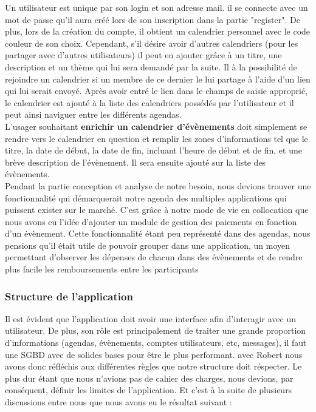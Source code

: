 Un utilisateur est unique par son login et son adresse mail. il se connecte avec un mot de passe qu'il aura créé lors de son inscription dans la partie "register". De plus, lors de la création du compte, il obtient un calendrier personnel avec le code couleur de son choix. Cependant, s'il désire avoir d'autres calendriers (pour les partager avec d'autres utilisateurs) il peut en ajouter grâce à un titre, une description et un thème qui lui sera demandé par la suite.
Il à la possibilité de rejoindre un calendrier si un membre de ce dernier le lui partage à l'aide d'un lien qui lui serait envoyé. Après avoir entré le lien dans le champs de saisie approprié, le calendrier est ajouté à la liste des calendriers possédés par l'utilisateur et il peut ainsi naviguer entre les différents agendas. 
\\

L'usager souhaitant \textbf{enrichir un calendrier d'évènements} doit simplement se rendre vers le calendrier en question et remplir les zones d'informations tel que le titre, la date de début, la date de fin, incluant l'heure de début et de fin, et une brève description de l'évènement. Il sera ensuite ajouté sur la liste des évènements.
\\
Pendant la partie conception et analyse de notre besoin, nous devions trouver une fonctionnalité qui démarquerait notre agenda des multiples applications qui puissent exister sur le marché.
C'est grâce à notre mode de vie en collocation que nous avons eu l'idée d'ajouter un module de gestion des paiements en fonction d'un évènement. Cette fonctionnalité étant peu représenté dans des agendas, nous pensions qu'il était utile de pouvoir grouper dans une application, un moyen permettant d'observer les dépenses de chacun dans des évènements et de rendre plus facile les remboursements entre les participants

\newpage

\subsubsection{Structure de l'application}

Il est évident que l'application doit avoir une interface afin d'interagir avec un utilisateur. De plus, son rôle est principalement de traiter une grande proportion d'informations (agendas, évènements, comptes utilisateurs, etc, messages), il faut une SGBD avec de solides bases pour être le plus performant. avec Robert nous avons donc réfléchis aux différentes règles que notre structure doit réspecter.
Le plus dur étant que nous n'avions pas de cahier des charges, nous devions, par conséquent, définir les limites de l'application. Et c'est à la suite de plusieurs discussions entre nous que nous avons eu le résultat suivant :

